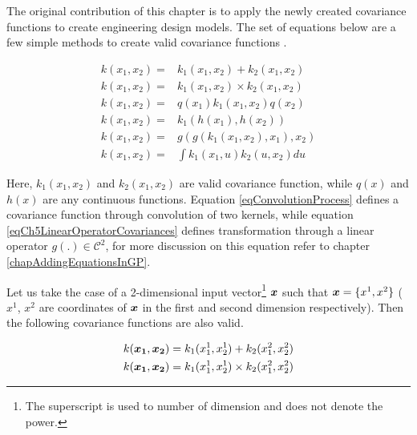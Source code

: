 The original contribution of this chapter is to apply the newly created covariance functions to create engineering design models. The set of equations below are a few simple methods to create valid covariance functions \cite{bishop2006pattern, mackay2003information, durrande2001etude, durrande2013anova}. 

\begin{align}
k(x_{1}, x_{2}) =  & k_{1}(x_{1}, x_{2}) + k_{2}(x_{1}, x_{2})  \label{eqCh5AddingCovariances} \\
k(x_{1}, x_{2}) =  & k_{1}(x_{1}, x_{2}) \times k_{2}(x_{1}, x_{2}) \label{eqCh5MultiplyingCovariances} \\
k(x_{1}, x_{2}) =  & q(x_{1})k_{1}(x_{1}, x_{2})q(x_{2}) \label{eqCh5MultiplyingWithFunction} \\
k(x_{1}, x_{2}) =  & k_{1}(h(x_{1}), h(x_{2})) \label{eqCh5ComposedCovariances} \\
k(x_{1}, x_{2}) =  & g(g(k_{1}(x_{1}, x_{2}), x_{1}), x_{2} ) \label{eqCh5LinearOperatorCovariances} \\
k(x_{1}, x_{2}) = & \int k_{1}(x_{1}, u)k_{2}(u, x_{2})du \label{eqConvolutionProcess}
\end{align}


Here, $k_{1}(x_{1}, x_{2})$ and $k_{2}(x_{1}, x_{2})$ are valid covariance function, while $q(x)$ and $h(x)$ are any continuous functions. Equation \ref{eqConvolutionProcess} defines a covariance function through convolution of two kernels, while equation \ref{eqCh5LinearOperatorCovariances} defines transformation through a linear operator $g\left ( . \right ) \in \mathcal{C}^{2}$, for more discussion on this equation refer to chapter \ref{chapAddingEquationsInGP}. 

Let us take the case of a 2-dimensional input vector\footnote{The superscript is used to number of dimension and does not denote the power.} $\boldsymbol{x}$ such that $\boldsymbol{x} = \{x^{1}, x^{2}\}$ ($x^{1}$, $x^{2}$ are coordinates of $\boldsymbol{x}$ in the first and second dimension respectively). Then the following covariance functions are also valid.

\begin{align}
k(\boldsymbol{x_{1}}, \boldsymbol{x_{2}}) = k_{1}(x_{1}^{1}, x_{2}^{1}) + k_{2}(x_{1}^{2}, x_{2}^{2}) \label{eqCh5AddingAcrossDimensionsCovariances} \\
k(\boldsymbol{x_{1}}, \boldsymbol{x_{2}}) = k_{1}(x_{1}^{1}, x_{2}^{1}) \times k_{2}(x_{1}^{2}, x_{2}^{2}) \label{eqCh5MultiplyingAcrossDimensionsCovariances} 
\end{align}

